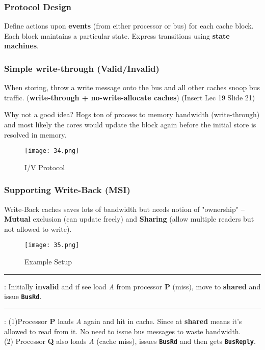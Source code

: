 \documentclass{article}
\begin{document}
\begin{multicols*}{2}
\subsubsection*{Protocol Design}
Define actions upon \textbf{events} (from either processor or bus) for each cache block. Each block maintains a particular state. Express transitions using \textbf{state machines}.

\subsubsection*{Simple write-through (Valid/Invalid)}
When storing, throw a write message onto the bus and all other caches snoop bus traffic. (\textbf{write-through + no-write-allocate caches}) (Insert Lec 19 Slide 21)
\medskip\par\noindent
Why not a good idea? Hogs ton of process to memory bandwidth (write-through) and most likely the cores would update the block again before the initial store is resolved in memory.

\begin{figure}[H]
    \centering
    {\texttt{[image: 34.png]}}
  \caption{I/V Protocol}
\end{figure}

\subsubsection*{Supporting Write-Back (MSI)}
Write-Back caches saves lots of bandwidth but needs notion of "ownership" -- \textbf{Mutual} exclusion (can update freely) and \textbf{Sharing} (allow multiple readers but not allowed to write).

\begin{figure}[H]
    \centering
    {\texttt{[image: 35.png]}}
  \caption{Example Setup}
\end{figure}

\medskip\par\noindent
\smallskip\hrule\smallskip\noindent
[I$\rightarrow$S]: Initially \textbf{invalid} and if see load \textit{A} from processor \textbf{P} (miss), move to \textbf{shared} and issue \textbf{\texttt{BusRd}}.

\smallskip\hrule\smallskip\noindent
[S$\rightarrow$S]: (1)Processor \textbf{P} loads \textit{A} again and hit in cache. Since at \textbf{shared} means it's allowed to read from it. No need to issue bus messages to waste bandwidth.\\ 
(2) Processor \textbf{Q} also loads \textit{A} (cache miss), issues \textbf{\texttt{BusRd}} and then gets \textbf{\texttt{BusReply}}.


\end{multicols*}
\end{document}
